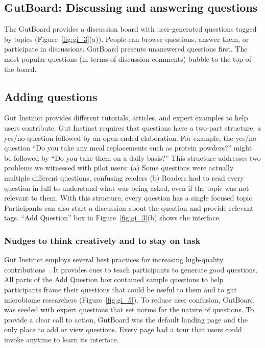 \subsection{GutBoard: Discussing and answering questions}
The GutBoard provides a discussion board with user-generated questions tagged by topics (Figure~\ref{fig:gi_3}(a)). People can browse questions, answer them, or participate in discussions. GutBoard presents unanswered questions first. The most popular questions (in terms of discussion comments) bubble to the top of the board.
 
\subsection{Adding questions}
Gut Instinct provides different tutorials, articles, and expert examples to help users contribute. Gut Instinct requires that questions have a two-part structure: a yes/no question followed by an open-ended elaboration. For example, the yes/no question “Do you take any meal replacements such as protein powders?” might be followed by “Do you take them on a daily basis?” This structure addresses two problems we witnessed with pilot users: (a) Some questions were actually multiple different questions, confusing readers (b) Readers had to read every question in full to understand what was being asked, even if the topic was not relevant to them. With this structure, every question has a single focused topic. Participants can also start a discussion about the question and provide relevant tags. “Add Question” box in Figure~\ref{fig:gi_3}(b) shows the interface.

\subsubsection{Nudges to think creatively and to stay on task}
Gut Instinct employs several best practices for increasing high-quality contributions~\cite{Jennett2014, Resnick2011}. It provides cues to teach participants to generate good questions. All parts of the Add Question box contained sample questions to help participants frame their questions that could be useful to them and to gut microbiome researchers (Figure~\ref{fig:gi_5}). To reduce user confusion, GutBoard was seeded with expert questions that set norms for the nature of questions. To provide a clear call to action, GutBoard was the default landing page and the only place to add or view questions. Every page had a tour that users could invoke anytime to learn its interface.

